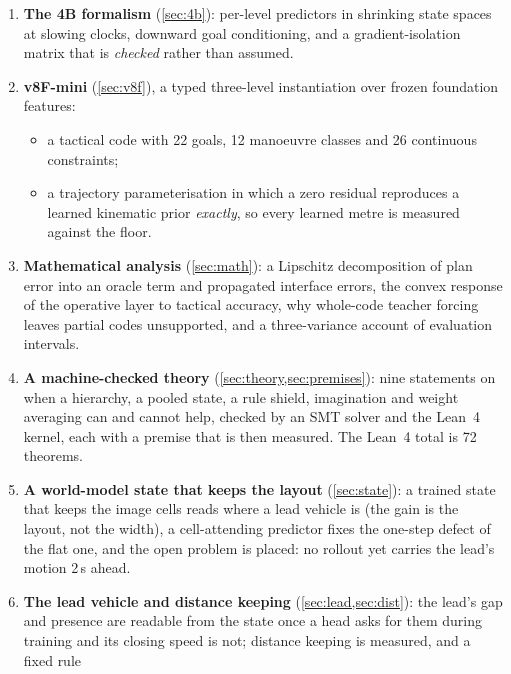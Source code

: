 \documentclass[10pt,twocolumn]{article}
\makeatletter
\theoremstyle{remark}
\renewcommand\paragraph{\@startsection{paragraph}{4}{\z@}{1.6ex \@plus .5ex \@minus .2ex}{-1em}{\normalfont\normalsize\bfseries}}
\makeatother
\begin{document}
\paragraph{Contributions.}
\begin{enumerate}[label=(\roman*)]
  \item \textbf{The 4B formalism} (\cref{sec:4b}): per-level predictors in shrinking state spaces at slowing clocks, downward goal
        conditioning, and a gradient-isolation matrix that is \emph{checked} rather than assumed.
  \item \textbf{v8F-mini} (\cref{sec:v8f}), a typed three-level instantiation over frozen foundation features:
        \begin{itemize}
          \item a tactical code with 22 goals, 12 manoeuvre classes and 26 continuous constraints;
          \item a trajectory parameterisation in which a zero residual reproduces a learned kinematic prior \emph{exactly}, so every
                learned metre is measured against the floor.
        \end{itemize}
  \item \textbf{Mathematical analysis} (\cref{sec:math}): a Lipschitz decomposition of plan error into an oracle term and propagated
        interface errors, the convex response of the operative layer to tactical accuracy, why whole-code teacher forcing leaves
        partial codes unsupported, and a three-variance account of evaluation intervals.
  \item \textbf{A machine-checked theory} (\cref{sec:theory,sec:premises}): nine statements on when a hierarchy, a pooled state, a
        rule shield, imagination and weight averaging can and cannot help, checked by an SMT solver and the Lean~4 kernel, each
        with a premise that is then measured. The Lean~4 total is 72 theorems.
  \item \textbf{A world-model state that keeps the layout} (\cref{sec:state}): a trained state that keeps the image cells reads
        where a lead vehicle is (the gain is the layout, not the width), a cell-attending predictor fixes the one-step defect of
        the flat one, and the open problem is placed: no rollout yet carries the lead's motion 2\,s ahead.
  \item \textbf{The lead vehicle and distance keeping} (\cref{sec:lead,sec:dist}): the lead's gap and presence are readable from
        the state once a head asks for them during training and its closing speed is not; distance keeping is measured, and a fixed rule

\end{enumerate}
\end{document}

